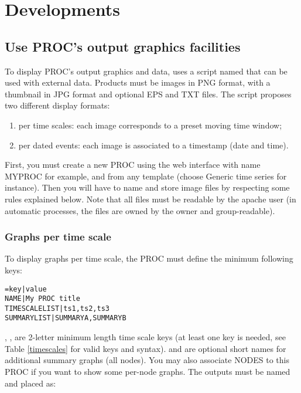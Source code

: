 
\chapter{Developments}



\section{Use PROC's output graphics facilities}

To display PROC's output graphics and data, \webobs uses a script named  that can be used with external data. Products must be images in PNG format, with a thumbnail in JPG format and optional EPS and TXT files. The script proposes two different display formats:
\begin{enumerate}
\item per time scales: each image corresponds to a preset moving time window;
\item per dated events: each image is associated to a timestamp (date and time).
\end{enumerate}

First, you must create a new PROC using the web interface with name MYPROC for example, and from any template (choose Generic time series for instance). Then you will have to name and store image files by respecting some rules explained below. Note that all files must be readable by the apache user (in \webobs automatic processes, the files are owned by the \webobs owner and group-readable).

\subsection{Graphs per time scale}

To display graphs per time scale, the PROC must define the minimum following keys:

\begin{lstlisting}[title=MYPROC.conf]
=key|value
NAME|My PROC title
TIMESCALELIST|ts1,ts2,ts3
SUMMARYLIST|SUMMARYA,SUMMARYB
\end{lstlisting}

, ,  are 2-letter minimum length time scale keys (at least one key is needed, see Table \ref{timescales} for valid keys and syntax).  and  are optional short names for additional summary graphs (all nodes). You may also associate NODES to this PROC if you want to show some per-node graphs. The outputs must be named and placed as:


